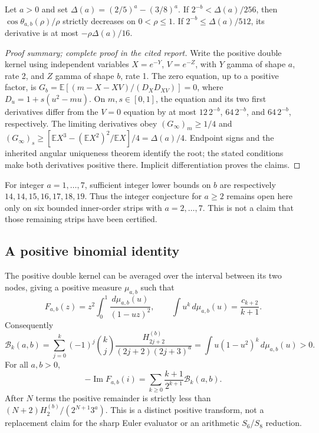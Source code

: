 \begin{theorem}
\label{grm:thm:inner}
Let $a>0$ and set
$\Delta(a)=(2/5)^a-(3/8)^a$.
If $2^{-b}<\Delta(a)/256$, then $\cos\theta_{a,b}(\rho)/\rho$
strictly decreases on $0<\rho\le1$.
If $2^{-b}\le\Delta(a)/512$, its derivative is at most
$-\rho\Delta(a)/16$.
\end{theorem}
\begin{proof}[Proof summary; complete proof in the cited report]
Write the positive double kernel using independent variables
$X=e^{-Y}$, $V=e^{-Z}$, with $Y$ gamma of shape $a$, rate 2, and $Z$
gamma of shape $b$, rate 1. The zero equation, up to a positive factor,
is $G_b=\mathbb E[(m-X-XV)/(D_XD_{XV})]=0$, where
$D_u=1+s(u^2-mu)$.
On $m,s\in[0,1]$, the equation and its two first derivatives differ
from the $V=0$ equation by at most $12\,2^{-b}$, $64\,2^{-b}$, and
$64\,2^{-b}$, respectively. The limiting derivatives obey
$(G_\infty)_m\ge1/4$ and
$(G_\infty)_s\ge[\mathbb EX^3-(\mathbb EX^2)^2/\mathbb EX]/4
=\Delta(a)/4$.
Endpoint signs and the inherited angular uniqueness theorem identify
the root; the stated conditions make both derivatives positive there.
Implicit differentiation proves the claims.
\end{proof}

For integer $a=1,\ldots,7$, sufficient integer lower bounds on $b$
are respectively $14,14,15,16,17,18,19$.
Thus the integer conjecture for $a\ge2$ remains open here only on six
bounded inner-order strips with $a=2,\ldots,7$. This is not a claim
that those remaining strips have been certified.

\subsection{A positive binomial identity}
\label{grm:sec:binomial}
The positive double kernel can be averaged over the interval between
its two nodes, giving a positive measure $\mu_{a,b}$ such that
\[
 F_{a,b}(z)=z^2\int_0^1\frac{d\mu_{a,b}(u)}{(1-uz)^2},
 \qquad \int u^k\,d\mu_{a,b}(u)=\frac{c_{k+2}}{k+1}.
\]
Consequently
\[
 \mathcal B_k(a,b)=\sum_{j=0}^k(-1)^j\binom kj
       \frac{H_{2j+2}^{(b)}}{(2j+2)(2j+3)^a}
 =\int u(1-u^2)^k\,d\mu_{a,b}(u)>0.
\]
For all $a,b>0$,
\[
 -\operatorname{Im}F_{a,b}(i)
 =\sum_{k\ge0}\frac{k+1}{2^{k+1}}\mathcal B_k(a,b).
\]
After $N$ terms the positive remainder is strictly less than
$(N+2)H_2^{(b)}/(2^{N+1}3^a)$.
This is a distinct positive transform, not a replacement claim for the
sharp Euler evaluator or an arithmetic $S_6$/$S_8$ reduction.
